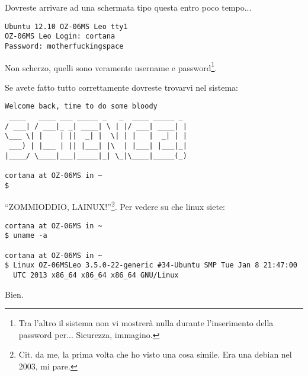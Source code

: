 \documentclass[a4paper]{memoir}
\begin{document}
		Dovreste arrivare ad una schermata tipo questa entro poco tempo...
		
		\begin{Verbatim}[label=Login + Password]
Ubuntu 12.10 OZ-06MS Leo tty1
OZ-06MS Leo Login: cortana
Password: motherfuckingspace
		\end{Verbatim}

		Non scherzo, quelli sono veramente username e password\footnote{Tra l'altro il sistema non vi mostrerà
		nulla durante l'inserimento della password per... Sicurezza, immagino.}.
		
		Se avete fatto tutto correttamente dovreste trovarvi nel sistema:

		\begin{Verbatim}[label=Party like it's 1999!]
Welcome back, time to do some bloody
 ____   ____ ___ _____ _   _  ____ _____ _ 
/ ___| / ___|_ _| ____| \ | |/ ___| ____| |
\___ \| |    | ||  _| |  \| | |   |  _| | |
 ___) | |___ | || |___| |\  | |___| |___|_|
|____/ \____|___|_____|_| \_|\____|_____(_)

cortana at OZ-06MS in ~
$ 
		\end{Verbatim}
		
		``ZOMMIODDIO, LAINUX!''\footnote{Cit. da me, la prima volta che ho visto una cosa simile. Era una debian
		nel 2003, mi pare.}. Per vedere su che linux siete:
		
		\begin{Verbatim}
cortana at OZ-06MS in ~
$ uname -a

cortana at OZ-06MS in ~
$ Linux OZ-06MSLeo 3.5.0-22-generic #34-Ubuntu SMP Tue Jan 8 21:47:00
  UTC 2013 x86_64 x86_64 x86_64 GNU/Linux
		\end{Verbatim}

		Bien.
\end{document}
